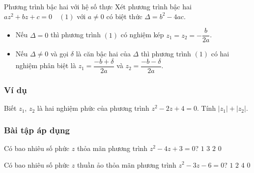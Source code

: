 \begin{dang}{Phương trình bậc hai với hệ số thực}
	Xét phương trình bậc hai $az^2+bz+c=0\quad (1)$ với $a\neq 0$ có biệt thức $\Delta=b^2-4ac$.
	\begin{itemize}
		\item Nếu $\Delta=0$ thì phương trình $(1)$ có nghiệm kép $z_1=z_2=-\dfrac{b}{2a}$.
		\item Nếu $\Delta\neq 0$ và gọi $\delta$ là căn bậc hai của $\Delta$ thì phương trình $(1)$ có hai nghiệm phân biệt là 
		$z_1=\dfrac{-b+\delta}{2a}$ và $z_2=\dfrac{-b-\delta}{2a}$.
	\end{itemize}
\end{dang}
\subsubsection{Ví dụ}

\begin{vd}%
	Biết $z_1$, $z_2$ là hai nghiệm phức của phương trình $z^2-2z+4=0$. Tính $|z_1|+|z_2|$.
\end{vd}

\subsubsection{Bài tập áp dụng}
\begin{ex}%
    Có bao nhiêu số phức $z$ thỏa mãn phương trình $z^2-4z+3=0$?
    \choice
    {$1$}
    {$3$}
    {\True $2$}
    {$0$}
\end{ex} 

\begin{ex}%
    Có bao nhiêu số phức $z$ thuần ảo thỏa mãn phương trình $z^2-3z-6=0$?
    \choice
    {$1$}
    {$2$}
    {$4$}
    {\True $0$}
\end{ex} 


